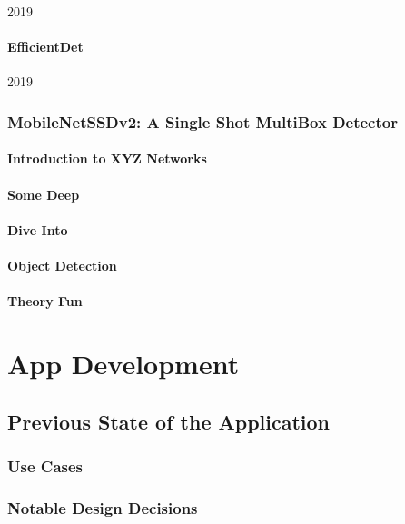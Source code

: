 \documentclass[
			   fontsize=11pt,
               paper=a4,
               bibliography=totoc,
               idxtotoc,
               headsepline,
               footsepline,
               footinclude=false,
               BCOR=12mm,
               DIV=13,
               openany,   %
               ]
               {scrbook}
\begin{document}
2019

\subsubsection{EfficientDet}

2019


\subsection{MobileNetSSDv2: A Single Shot MultiBox Detector}

\subsubsection{Introduction to XYZ Networks}


\subsubsection{Some Deep}
\subsubsection{Dive Into}
\subsubsection{Object Detection}
\subsubsection{Theory Fun}

\chapter{App Development}

\section{Previous State of the Application}

\subsection{Use Cases}

\subsection{Notable Design Decisions}
\end{document}
